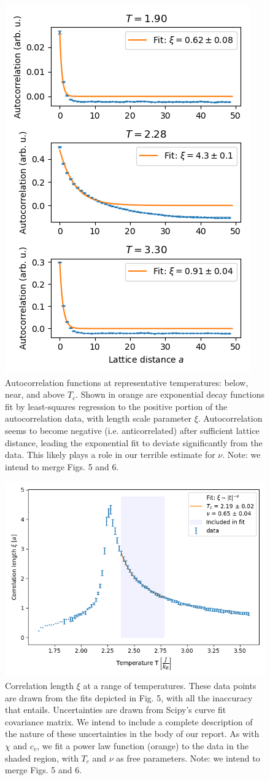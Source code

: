 \documentclass[letter,scriptaddress,twocolumn, prl,nofootinbib]{revtex4}
\begin{document}
\begin{figure}[h]
	\begin{center}
		\includegraphics[width=.4\textwidth]{figs/fig4_autocors.png}
		\caption{Autocorrelation functions at representative temperatures: below, near, and above $T_c$. Shown in orange are exponential decay functions fit by least-squares regression to the positive portion of the autocorrelation data, with length scale parameter $\xi$. Autocorrelation seems to become negative (i.e. anticorrelated) after sufficient lattice distance, leading the exponential fit to deviate significantly from the data. This likely plays a role in our terrible estimate for $\nu$. Note: we intend to merge Figs. 5 and 6.}
		\label{fig:fig4a}
	\end{center}
\end{figure}
\begin{figure}[h]
	\begin{center}
		\includegraphics[width=.4\textwidth]{figs/fig4_xi.png}
		\caption{Correlation length $\xi$ at a range of temperatures. These data points are drawn from the fits depicted in Fig. 5, with all the inaccuracy that entails. Uncertainties are drawn from Scipy's curve fit covariance matrix. We intend to include a complete description of the nature of these uncertainties in the body of our report. As with $\chi$ and $c_v$, we fit a power law function (orange) to the data in the shaded region, with $T_c$ and $\nu$ as free parameters. Note: we intend to merge Figs. 5 and 6.}
		\label{fig:fig4b}
	\end{center}
\end{figure}
\end{document}
